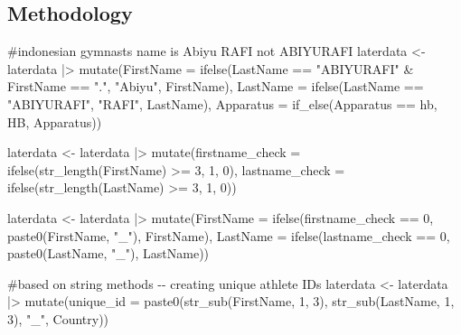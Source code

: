 \documentclass[
  letterpaper,
  DIV=11,
  numbers=noendperiod]{scrartcl}
\newenvironment{Shaded}{\begin{snugshade}}{\end{snugshade}}
\newcommand{\AttributeTok}[1]{\textcolor[rgb]{0.40,0.45,0.13}{#1}}
\newcommand{\CommentTok}[1]{\textcolor[rgb]{0.37,0.37,0.37}{#1}}
\newcommand{\DecValTok}[1]{\textcolor[rgb]{0.68,0.00,0.00}{#1}}
\newcommand{\FunctionTok}[1]{\textcolor[rgb]{0.28,0.35,0.67}{#1}}
\newcommand{\NormalTok}[1]{\textcolor[rgb]{0.00,0.23,0.31}{#1}}
\newcommand{\OtherTok}[1]{\textcolor[rgb]{0.00,0.23,0.31}{#1}}
\newcommand{\SpecialCharTok}[1]{\textcolor[rgb]{0.37,0.37,0.37}{#1}}
\newcommand{\StringTok}[1]{\textcolor[rgb]{0.13,0.47,0.30}{#1}}
\begin{document}
\hypertarget{methodology}{%
\subsection{Methodology}\label{methodology}}

\begin{Shaded}
\begin{Highlighting}[]
\CommentTok{\#indonesian gymnast\textquotesingle{}s name is Abiyu RAFI not ABIYURAFI}
\NormalTok{laterdata }\OtherTok{\textless{}{-}}\NormalTok{ laterdata }\SpecialCharTok{|\textgreater{}}
  \FunctionTok{mutate}\NormalTok{(}\AttributeTok{FirstName =} \FunctionTok{ifelse}\NormalTok{(LastName }\SpecialCharTok{==} \StringTok{"ABIYURAFI"} \SpecialCharTok{\&}\NormalTok{ FirstName }\SpecialCharTok{==} \StringTok{"."}\NormalTok{, }\StringTok{"Abiyu"}\NormalTok{, FirstName),}
    \AttributeTok{LastName =} \FunctionTok{ifelse}\NormalTok{(LastName }\SpecialCharTok{==} \StringTok{"ABIYURAFI"}\NormalTok{, }\StringTok{"RAFI"}\NormalTok{, LastName),}
    \AttributeTok{Apparatus =} \FunctionTok{if\_else}\NormalTok{(Apparatus }\SpecialCharTok{==} \StringTok{\textquotesingle{}hb\textquotesingle{}}\NormalTok{, }\StringTok{\textquotesingle{}HB\textquotesingle{}}\NormalTok{, Apparatus))}


\NormalTok{laterdata }\OtherTok{\textless{}{-}}\NormalTok{ laterdata }\SpecialCharTok{|\textgreater{}}
  \FunctionTok{mutate}\NormalTok{(}\AttributeTok{firstname\_check =} \FunctionTok{ifelse}\NormalTok{(}\FunctionTok{str\_length}\NormalTok{(FirstName) }\SpecialCharTok{\textgreater{}=} \DecValTok{3}\NormalTok{, }\DecValTok{1}\NormalTok{, }\DecValTok{0}\NormalTok{),}
         \AttributeTok{lastname\_check =} \FunctionTok{ifelse}\NormalTok{(}\FunctionTok{str\_length}\NormalTok{(LastName) }\SpecialCharTok{\textgreater{}=} \DecValTok{3}\NormalTok{, }\DecValTok{1}\NormalTok{, }\DecValTok{0}\NormalTok{))}

\NormalTok{laterdata }\OtherTok{\textless{}{-}}\NormalTok{ laterdata }\SpecialCharTok{|\textgreater{}}
  \FunctionTok{mutate}\NormalTok{(}\AttributeTok{FirstName =} \FunctionTok{ifelse}\NormalTok{(firstname\_check }\SpecialCharTok{==} \DecValTok{0}\NormalTok{, }\FunctionTok{paste0}\NormalTok{(FirstName, }\StringTok{"\_"}\NormalTok{), FirstName),}
         \AttributeTok{LastName =} \FunctionTok{ifelse}\NormalTok{(lastname\_check }\SpecialCharTok{==} \DecValTok{0}\NormalTok{, }\FunctionTok{paste0}\NormalTok{(LastName, }\StringTok{"\_"}\NormalTok{), LastName))}

\CommentTok{\#based on string methods {-}{-} creating unique athlete IDs}
\NormalTok{laterdata }\OtherTok{\textless{}{-}}\NormalTok{ laterdata }\SpecialCharTok{|\textgreater{}}
  \FunctionTok{mutate}\NormalTok{(}\AttributeTok{unique\_id =} \FunctionTok{paste0}\NormalTok{(}\FunctionTok{str\_sub}\NormalTok{(FirstName, }\DecValTok{1}\NormalTok{, }\DecValTok{3}\NormalTok{), }\FunctionTok{str\_sub}\NormalTok{(LastName, }\DecValTok{1}\NormalTok{, }\DecValTok{3}\NormalTok{), }\StringTok{"\_"}\NormalTok{, Country))}


\end{Highlighting}
\end{Shaded}
\end{document}
